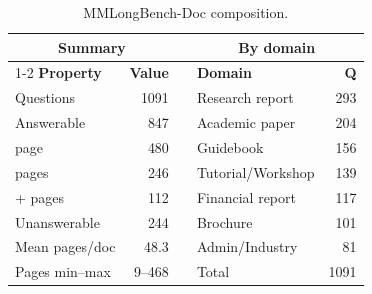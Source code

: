 %
%
%
\begin{table}[t]
\centering
\small
\setlength{\tabcolsep}{5pt}
\begin{tabular}{lrclr}
\toprule
\multicolumn{2}{c}{\textbf{Summary}} && \multicolumn{2}{c}{\textbf{By domain}} \\
\cmidrule{1-2}\cmidrule{4-5}
\textbf{Property} & \textbf{Value} && \textbf{Domain} & \textbf{Q} \\
\midrule
  Questions          & 1091   && Research report   & 293 \\
  \quad Answerable    & 847    && Academic paper    & 204 \\
  \quad\quad 1 page    & 480    && Guidebook         & 156 \\
  \quad\quad 2 pages   & 246    && Tutorial/Workshop & 139 \\
  \quad\quad 3+ pages  & 112    && Financial report  & 117 \\
  \quad Unanswerable  & 244    && Brochure          & 101 \\
  Mean pages/doc     & 48.3   && Admin/Industry    &  81 \\
  Pages min--max     & 9--468 && Total             & 1091 \\
\bottomrule
\end{tabular}
\caption{MMLongBench-Doc composition.}
\label{tab:mmlb_composition}
\end{table}
